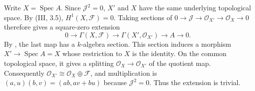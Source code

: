 Write $X=\operatorname{Spec}A$. Since $\mathcal J^2=0$, $X'$ and $X$ have the same underlying topological space. By (III, 3.5), $H^1(X,\mathcal F)=0$. Taking sections of $0\to\mathcal J\to\mathcal O_{X'}\to\mathcal O_X\to0$ therefore gives a square-zero extension
\[0\to\Gamma(X,\mathcal F)\to\Gamma(X',\mathcal O_{X'})\to A\to0.\]
By , the last map has a $k$-algebra section. This section induces a morphism $X'\to\operatorname{Spec}A=X$ whose restriction to $X$ is the identity. On the common topological space, it gives a splitting $\mathcal O_X\to\mathcal O_{X'}$ of the quotient map. Consequently $\mathcal O_{X'}\cong\mathcal O_X\oplus\mathcal F$, and multiplication is $(a,u)(b,v)=(ab,av+bu)$ because $\mathcal J^2=0$. Thus the extension is trivial.

